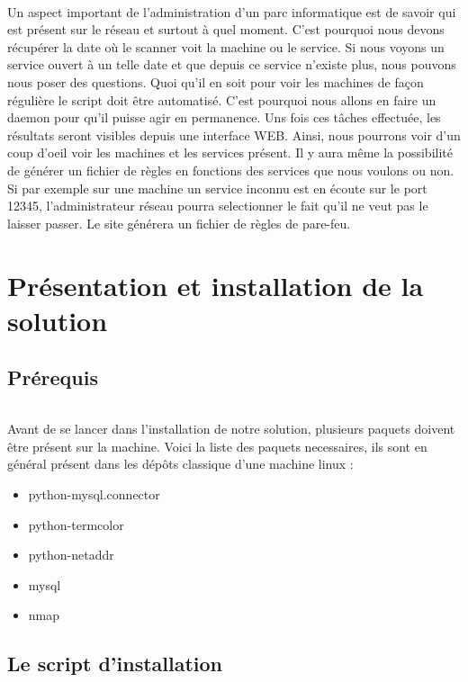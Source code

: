 \documentclass[12pt]{report}
\begin{document}
		\paragraph{}
			Un aspect important de l'administration d'un parc informatique est de savoir qui est présent sur le réseau et surtout à quel moment. C'est pourquoi nous devons récupérer la date où le scanner voit la machine ou le service. Si nous voyons un service ouvert à un telle date et que depuis ce service n'existe plus, nous pouvons nous poser des questions. Quoi qu'il en soit pour voir les machines de façon régulière le script doit être automatisé. C'est pourquoi nous allons en faire un daemon pour qu'il puisse agir en permanence. Uns fois ces tâches effectuée, les résultats seront visibles depuis une interface WEB. Ainsi, nous pourrons voir d'un coup d'oeil voir les machines et les services présent. Il y aura même la possibilité de générer un fichier de règles en fonctions des services que nous voulons ou non. Si par exemple sur une machine un service inconnu est en écoute sur le port 12345, l'administrateur réseau pourra selectionner le fait qu'il ne veut pas le laisser passer. Le site générera un fichier de règles de pare-feu.
\part{Présentation et installation de la solution}
	\chapter{Prérequis}
		\paragraph{}
			Avant de se lancer dans l'installation de notre solution, plusieurs paquets doivent être présent sur la machine. Voici la liste des paquets necessaires, ils sont en général présent dans les dépôts classique d'une machine linux :
			\begin{itemize}
				\item python-mysql.connector
				\item python-termcolor
				\item python-netaddr
				\item mysql
				\item nmap
			\end{itemize}
	\chapter{Le script d'installation}
\end{document}
